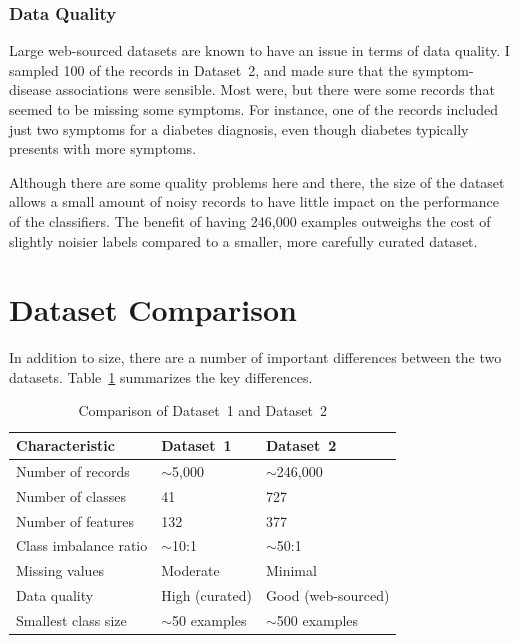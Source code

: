 \subsubsection{Data Quality}

Large web-sourced datasets are known to have an issue in terms of data quality. I sampled 100 of the records in Dataset~2, and made sure that the symptom-disease associations were sensible. Most were, but there were some records that seemed to be missing some symptoms. For instance, one of the records included just two symptoms for a diabetes diagnosis, even though diabetes typically presents with more symptoms.

Although there are some quality problems here and there, the size of the dataset allows a small amount of noisy records to have little impact on the performance of the classifiers. The benefit of having 246{,}000 examples outweighs the cost of slightly noisier labels compared to a smaller, more carefully curated dataset.

\section{Dataset Comparison}
\label{sec:dataset_comparison}

In addition to size, there are a number of important differences between the two datasets. Table~\ref{tab:dataset_comparison} summarizes the key differences.

\begin{table}[H]
\centering
\caption{Comparison of Dataset~1 and Dataset~2}
\label{tab:dataset_comparison}
\begin{tabular}{@{}lll@{}}
\toprule
\textbf{Characteristic} & \textbf{Dataset~1} & \textbf{Dataset~2} \\
\midrule
Number of records & $\sim$5,000 & $\sim$246,000 \\
Number of classes & 41 & 727 \\
Number of features & 132 & 377 \\
Class imbalance ratio & $\sim$10:1 & $\sim$50:1 \\
Missing values & Moderate & Minimal \\
Data quality & High (curated) & Good (web-sourced) \\
Smallest class size & $\sim$50 examples & $\sim$500 examples \\
\bottomrule
\end{tabular}
\end{table}

